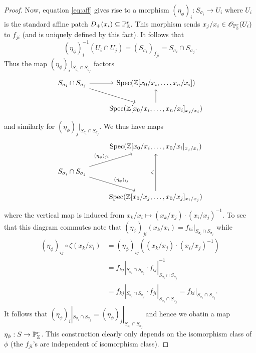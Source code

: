 \documentclass{memoir}
\begin{document}
\begin{proof}
    Now, equation \ref{eq:aff} gives rise to a morphism $(\eta_{\phi})_i:S_{\sigma_i}\to U_i$ where $U_i$ is the standard affine patch $D_+(x_i)\subseteq \mathbb{P}^r_{\mathbb{Z}}$.
    This morphism sends $x_j/x_i\in \mathscr{O}_{\mathbb{P}^r_{\mathbb{Z}}}(U_i)$ to $f_{ji}$ (and is uniquely defined by this fact).
    It follows that
    \begin{equation}
        (\eta_{\phi})_i^{-1}(U_i\cap U_j) = (S_{\sigma_i})_{f_{ji}} = S_{\sigma_i} \cap S_{\sigma_j}.
    \end{equation}
    Thus the map $(\eta_\phi)_i|_{S_{\sigma_i}\cap S_{\sigma_j}}$ factors 
    \begin{equation}
        \begin{tikzcd}
            S_{\sigma_i}\cap S_{\sigma_j} \arrow[r] \arrow[dr] & \Spec(\Z[x_0/x_i,\dots,x_n/x_i]) \\
                                                               & \Spec(\Z[x_0/x_i,\dots,x_n/x_i]_{x_j/x_i}) \arrow[u]
        \end{tikzcd}
    \end{equation}
    and similarly for $(\eta_\phi)_j|_{S_{\sigma_i}\cap S_{\sigma_j}}$.
    We thus have maps
    \begin{equation}
        \begin{tikzcd}
                                              & \Spec(\Z[x_0/x_i,\dots,x_0/x_i]_{x_j/x_i}) \\
            S_{\sigma_i}\cap S_{\sigma_j}\arrow[ur,"(\eta_\phi)_{ji}"] \arrow[dr,"(\eta_\phi)_{ij}"] & \\
                                                               & \Spec(\Z[x_0/x_j,\dots,x_0/x_j]_{x_i/x_j}) \arrow[uu,"\zeta"]
        \end{tikzcd}
    \end{equation}
    where the vertical map is induced from $x_k/x_i\mapsto (x_k/x_j)\cdot (x_i/x_j)^{-1}$.
    To see that this diagram commutes note that $(\eta_\phi)_{ji}(x_k/x_i) = f_{ki}|_{S_{\sigma_i}\cap S_{\sigma_j}}$ while
    \begin{align}
        (\eta_\phi)_{ij}\circ \zeta(x_k/x_i) &= (\eta_\phi)_{ij}\left((x_k/x_j)\cdot (x_i/x_j)^{-1}\right) \nonumber \\
                                             &= f_{kj}|_{S_{\sigma_i}\cap S_{\sigma_j}} \cdot f_{ij}|_{S_{\sigma_i}\cap S_{\sigma_j}}^{-1} \nonumber \\
                                             &= f_{kj}|_{S_{\sigma_i}\cap S_{\sigma_j}} \cdot f_{ji}|_{S_{\sigma_i}\cap S_{\sigma_j}} = f_{ki}|_{S_{\sigma_i}\cap S_{\sigma_j}}.
    \end{align}
    It follows that $(\eta_\phi)_i|_{S_{\sigma_i} \cap S_{\sigma_j}} = (\eta_\phi)_j|_{S_{\sigma_i} \cap S_{\sigma_j}}$ and hence we obatin a map $\eta_\phi:S\to \mathbb{P}^r_{\mathbb{Z}}$.
    This construction clearly only depends on the isomorphism class of $\phi$ (the $f_{ji}$'s are independent of isomorphism class).


\end{proof}
\end{document}
